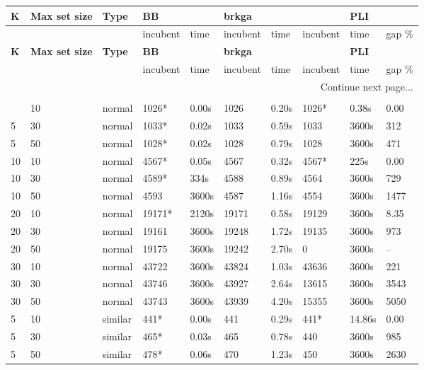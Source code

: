 \begin{scriptsize}
\setlength\LTleft{0pt}            %
\setlength\LTright{0pt}           %
\label{table:tests}
\begin{longtable}{@{\extracolsep{\fill}}l|l|l|ll|ll|lll@{}}
\hline
\textbf{K} & \textbf{Max set size} & \textbf{Type} & \textbf{BB} & & \textbf{brkga} & & & \textbf{PLI}\\ 
\hline
& & & incubent & time & incubent & time & incubent & time & gap \%\\ 
\hline
\endfirsthead
\hline
\textbf{K} & \textbf{Max set size} & \textbf{Type} & \textbf{BB} & & \textbf{brkga} & & & \textbf{PLI}\\ 
\hline
& & & incubent & time & incubent & time & incubent & time & gap \%\\ 
\hline
\endhead
\hline \multicolumn{10}{r}{{Continue next page...}} \\ 
\endfoot
\multicolumn{10}{r}{{}} \\ 
\endlastfoot
 5 & 10 & normal& 1026*& 0.00s& 1026& 0.20s & 1026*& 0.38s & 0.00 \\
 5 & 30 & normal& 1033*& 0.02s& 1033& 0.59s & 1033& 3600s& 312 \\
 5 & 50 & normal& 1028*& 0.02s& 1028& 0.79s & 1028& 3600s& 471 \\
 10 & 10 & normal& 4567*& 0.05s& 4567& 0.32s & 4567*& 225s & 0.00 \\
 10 & 30 & normal& 4589*& 334s & 4588& 0.89s & 4564& 3600s& 729 \\
 10 & 50 & normal& 4593& 3600s& 4587& 1.16s & 4554& 3600s& 1477 \\
 20 & 10 & normal& 19171*& 2120s & 19171& 0.58s & 19129& 3600s& 8.35 \\
 20 & 30 & normal& 19161& 3600s& 19248& 1.72s & 19135& 3600s& 973 \\
 20 & 50 & normal& 19175& 3600s& 19242& 2.70s & 0& 3600s& -- \\
 30 & 10 & normal& 43722& 3600s& 43824& 1.03s & 43636& 3600s& 221 \\
 30 & 30 & normal& 43746& 3600s& 43927& 2.64s & 13615& 3600s& 3543 \\
 30 & 50 & normal& 43743& 3600s& 43939& 4.20s & 15355& 3600s& 5050 \\
 5 & 10 & similar& 441*& 0.00s& 441& 0.29s & 441*& 14.86s & 0.00 \\
 5 & 30 & similar& 465*& 0.03s& 465& 0.78s & 440& 3600s& 985 \\
 5 & 50 & similar& 478*& 0.06s& 470& 1.23s & 450& 3600s& 2630 \\

\end{longtable}
\end{scriptsize}
